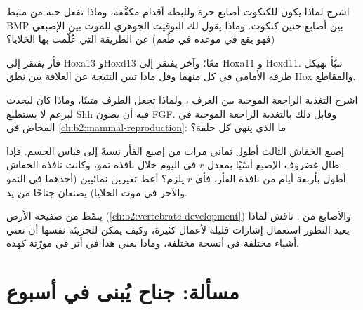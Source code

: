 \begin{exercise}[$\star\star$]\label{exo:b2:limb-organogenesis:8}
اشرح لماذا يكون للكتكوت أصابع حرة وللبطة أقدام مكفَّفة، وماذا تفعل
حبة من مثبط BMP بين أصابع جنين كتكوت. وماذا
يقول لك التوقيت الجوهري للموت بين الإصبعي (فهو يقع في
موعده في طُعم) عن الطريقة التي عُلّمت بها الخلايا؟
\end{exercise}

\begin{exercise}[$\star\star$]\label{exo:b2:limb-organogenesis:9}
فأر يفتقر إلى Hoxa13 وHoxd13 معًا؛ وآخر يفتقر إلى Hoxa11 و
Hoxd11. تنبّأ بهيكل طرفه الأمامي في كل منهما وقل ماذا تبين
النتيجة عن العلاقة بين نطق Hox والمقاطع.
\end{exercise}

\begin{exercise}[$\star\star\star$]\label{exo:b2:limb-organogenesis:10}
اشرح التغذية الراجعة الموجبة بين العرف ، ولماذا
تجعل الطرف متينًا، وماذا كان ليحدث لبرعم لا يستطيع Shh فيه
أن يصون FGF. وقابل ذلك بالتغذية الراجعة الموجبة في
المخاض في \cref{ch:b2:mammal-reproduction}: ما الذي ينهي كل حلقة؟
\end{exercise}

\begin{exercise}[$\star\star\star$]\label{exo:b2:limb-organogenesis:11}
إصبع الخفاش الثالث أطول ثماني مرات من إصبع الفأر نسبةً
إلى قياس الجسم. فإذا طال غضروف الإصبع أسّيًا بمعدل
$r$ في اليوم خلال نافذة نمو، وكانت نافذة الخفاش أطول بأربعة
أيام من نافذة الفأر، فأي $r$ يلزم؟ أعط تغيرين
نمائيين (أحدهما في النمو والآخر في موت الخلايا) يصنعان
جناحًا من يد.
\end{exercise}

\begin{exercise}[$\star\star\star$]\label{exo:b2:limb-organogenesis:12}
ينمّط   من صفيحة الأرض
(\cref{ch:b2:vertebrate-development}) والأصابع من .
ناقش لماذا يعيد التطور استعمال إشارات قليلة لأعمال كثيرة، وكيف
يمكن للجزيئة نفسها أن تعني أشياء مختلفة في أنسجة مختلفة، وماذا
يعني هذا في أثر  في مورّثة كهذه.
\end{exercise}

\section{مسألة: جناح يُبنى في أسبوع}

